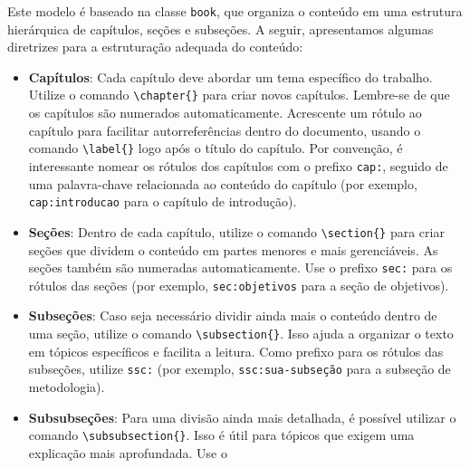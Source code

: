 Este modelo é baseado na classe \texttt{book}, que organiza o conteúdo em uma estrutura hierárquica
de capítulos, seções e subseções. A seguir, apresentamos algumas diretrizes para a estruturação
adequada do conteúdo:

\begin{itemize}
    \item \textbf{Capítulos}: Cada capítulo deve abordar um tema específico do trabalho. Utilize o
          comando \verb|\chapter{}| para criar novos capítulos. Lembre-se de que os capítulos são numerados
          automaticamente. Acrescente um rótulo ao capítulo para facilitar autorreferências dentro do
          documento, usando o comando \verb|\label{}| logo após o título do capítulo. Por convenção, é
          interessante nomear os rótulos dos capítulos com o prefixo \texttt{cap:}, seguido de uma
          palavra-chave relacionada ao conteúdo do capítulo (por exemplo, \texttt{cap:introducao} para o
          capítulo de introdução).
    \item \textbf{Seções}: Dentro de cada capítulo, utilize o comando \verb|\section{}| para criar
          seções que dividem o conteúdo em partes menores e mais gerenciáveis. As seções também são
          numeradas automaticamente. Use o prefixo \texttt{sec:} para os rótulos das seções (por exemplo,
          \texttt{sec:objetivos} para a seção de objetivos).
    \item \textbf{Subseções}: Caso seja necessário dividir ainda mais o conteúdo dentro de uma seção,
          utilize o comando \verb|\subsection{}|. Isso ajuda a organizar o texto em tópicos específicos e
          facilita a leitura. Como prefixo para os rótulos das subseções, utilize \texttt{ssc:} (por exemplo,
          \texttt{ssc:sua-subseção} para a subseção de metodologia).
\item \textbf{Subsubseções}: Para uma divisão ainda mais detalhada, é possível utilizar o comando \linebreak
          \verb|\subsubsection{}|. Isso é útil para tópicos que exigem uma explicação mais aprofundada. Use o

\end{itemize}
